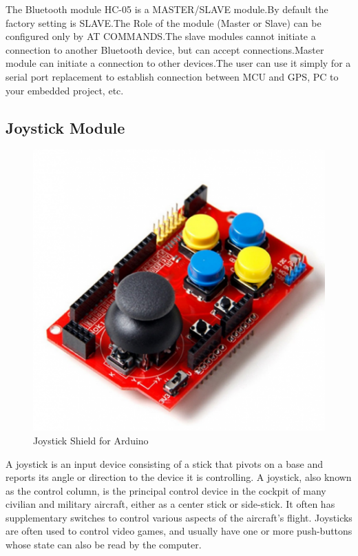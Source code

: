\documentclass[MTech]{iitmdiss}
\begin{document}
\noindent The Bluetooth module HC-05 is a MASTER/SLAVE module.By default the factory setting is SLAVE.The Role of the module (Master or Slave) can be configured only by AT COMMANDS.The slave modules cannot initiate a connection to another Bluetooth device, but can accept connections.Master module can initiate a connection to other devices.The user can use it simply for a serial port replacement to establish connection between MCU and GPS, PC to your embedded project, etc.

\subsection{Joystick Module}

	\begin{figure}[h]
		\includegraphics[scale=0.5]{ffigures/joy}
		\centering
		\caption{Joystick Shield for Arduino}
		\label{fig:joy}
	
	\end{figure}
	
A joystick is an input device consisting of a stick that pivots on a base and reports its angle or direction to the device it is controlling. A joystick, also known as the control column, is the principal control device in the cockpit of many civilian and military aircraft, either as a center stick or side-stick. It often has supplementary switches to control various aspects of the aircraft's flight. Joysticks are often used to control video games, and usually have one or more push-buttons whose state can also be read by the computer.
	
\end{document}

